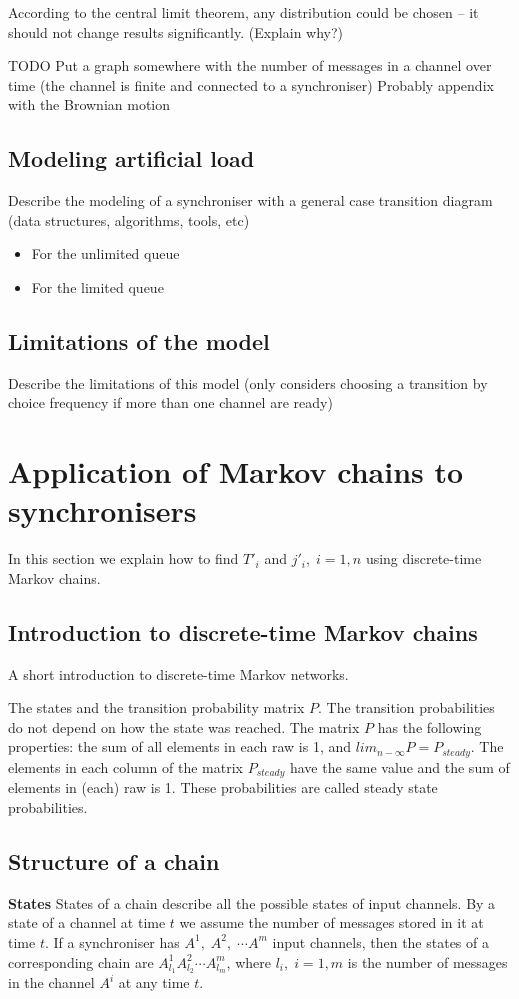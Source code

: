 According to the central limit theorem, any distribution could be chosen -- it should not change results significantly. (Explain why?)

TODO Put a graph somewhere with the number of messages in a channel over time (the channel is finite and connected to a synchroniser) Probably appendix with the Brownian motion

  \subsection{Modeling artificial load}
Describe the modeling of a synchroniser with a general case transition diagram (data structures, algorithms, tools, etc)
    \begin{itemize}
    \item For the unlimited queue
    \item For the limited queue
    \end{itemize}

  \subsection{Limitations of the model}
Describe the limitations of this model (only considers choosing a transition by choice frequency if more than one channel are ready)


\section{Application of Markov chains to synchronisers}
In this section we explain how to find $T'_{i}$ and $j'_{i}, \; i=1,n$ using discrete-time Markov chains.
  \subsection{Introduction to discrete-time Markov chains}
A short introduction to discrete-time Markov networks.

The states and the transition probability matrix $P$. The transition probabilities do not depend on how the state was reached. The matrix $P$ has the following properties: the sum of all elements in each raw is 1, and $lim_{n - \infty} P = P_{steady}$. The elements in each column of the matrix $P_{steady}$ have the same value and the sum of elements in (each) raw is 1. These probabilities are called steady state probabilities.

  \subsection{Structure of a chain}
\textbf{States} States of a chain describe all the possible states of input channels. By a state of a channel at time $t$ we assume the number of messages stored in it at time $t$. If a synchroniser has $A^1, \; A^2, \; \cdots A^m$ input channels, then the states of a corresponding chain are $A^1_{l_1} A^2_{l_2} \cdots A^m_{l_m}$, where $l_i, \; i=1,m$ is the number of messages in the channel $A^i$ at any time $t$.

